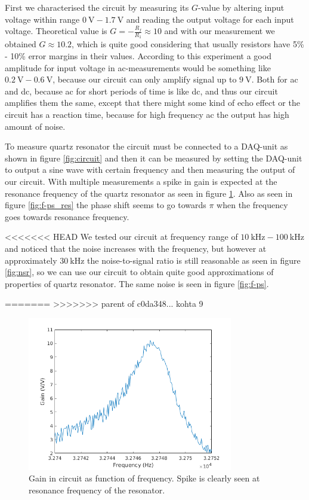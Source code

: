 \documentclass[12pt]{article}
\begin{document}
First we characterised the circuit by measuring its $G$-value by altering input voltage within range $\SI{0}{\volt} - \SI{1.7}{\volt}$ and reading the output voltage for each input voltage. Theoretical value is $G = -\frac{R_f}{R_1} \approx 10$ and with our measurement we obtained $G \approx 10.2$, which is quite good considering that usually resistors have 5\% - 10\% error margins in their values. According to this experiment a good amplitude for input voltage in ac-measurements would be something like $\SI{0.2}{\volt} - \SI{0.6}{\volt}$, because our circuit can only amplify signal up to $\SI{9}{\volt}$. Both for ac and dc, because ac for short periods of time is like dc, and thus our circuit amplifies them the same, except that there might some kind of echo effect or the circuit has a reaction time, because for high frequency ac the output has high amount of noise.

To measure quartz resonator the circuit must be connected to a DAQ-unit as shown in figure \ref{fig:circuit} and then it can be measured by setting the DAQ-unit to output a sine wave with certain frequency and then measuring the output of our circuit. With multiple measurements a spike in gain is expected at the resonance frequency of the quartz resonator as seen in figure \ref{fig:f-g}. Also as seen in figure \ref{fig:f-ps_res} the phase shift seems to go towards $\pi$ when the frequency goes towards resonance frequency.

<<<<<<< HEAD
We tested our circuit at frequency range of $\SI{10}{\kilo\hertz} - \SI{100}{\kilo\hertz}$ and noticed that the noise increases with the frequency, but however at approximately $\SI{30}{\kilo\hertz}$ the noise-to-signal ratio is still reasonable as seen in figure \ref{fig:nsr}, so we can use our circuit to obtain quite good approximations of properties of quartz resonator. The same noise is seen in figure \ref{fig:f-ps}.

=======
>>>>>>> parent of c0da348... kohta 9
\begin{figure}[!ht]
\centering
\includegraphics[width = 0.8\textwidth]{kuvat/f-g.png}
\caption{Gain in circuit as function of frequency. Spike is clearly seen at resonance frequency of the resonator.}
\label{fig:f-g}
\end{figure}
\end{document}
